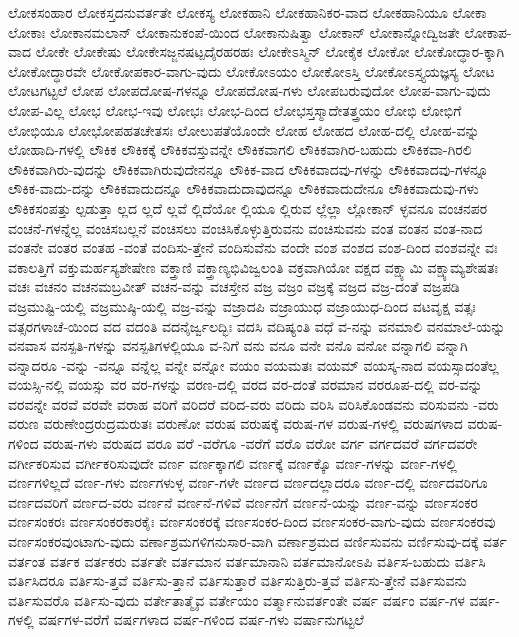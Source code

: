 {ಲೋಕಸಂಹಾರ
ಲೋಕಸ್ತದನುವರ್ತತೇ
ಲೋಕಸ್ಯ
ಲೋಕಹಾನಿ
ಲೋಕಹಾನಿಕರ-ವಾದ
ಲೋಕಹಾನಿಯೂ
ಲೋಕಾ
ಲೋಕಾಃ
ಲೋಕಾನಮಲಾನ್
ಲೋಕಾನುಕಂಪೆ-ಯಿಂದ
ಲೋಕಾನುಷಿತ್ವಾ
ಲೋಕಾನ್
ಲೋಕಾನ್ನೋದ್ವಿಜತೇ
ಲೋಕಾಪ-ವಾದ
ಲೋಕೇ
ಲೋಕೇಷು
ಲೋಕೇಸಜ್ಜನಷಟ್ಪದೈರಹರಹಃ
ಲೋಕೇಽಸ್ಮಿನ್
ಲೋಕೈಕ
ಲೋಕೋ
ಲೋಕೋದ್ಧಾರ-ಕ್ಕಾಗಿ
ಲೋಕೋದ್ಧಾರವೇ
ಲೋಕೋಪಕಾರ-ವಾಗು-ವುದು
ಲೋಕೋಽಯಂ
ಲೋಕೋಽಸ್ತಿ
ಲೋಕೋಽಸ್ತ್ಯಯಜ್ಞಸ್ಯ
ಲೋಟ
ಲೋಟಗಟ್ಟಲೆ
ಲೋಪ
ಲೋಪದೋಷ-ಗಳನ್ನೂ
ಲೋಪದೋಷ-ಗಳು
ಲೋಪಬರುವುದೋ
ಲೋಪ-ವಾಗು-ವುದು
ಲೋಪ-ವಿಲ್ಲ
ಲೋಭ
ಲೋಭ-ಇವು
ಲೋಭಃ
ಲೋಭ-ದಿಂದ
ಲೋಭಸ್ತಸ್ಮಾದೇತತ್ತ್ರಯಂ
ಲೋಭಿ
ಲೋಭಿಗೆ
ಲೋಭಿಯೂ
ಲೋಭೋಪಹತಚೇತಸಃ
ಲೋಲುಪತೆಯೊಂದೇ
ಲೋಹ
ಲೋಹದ
ಲೋಹ-ದಲ್ಲಿ
ಲೋಹ-ವನ್ನು
ಲೋಹಾದಿ-ಗಳಲ್ಲಿ
ಲೌಕಿಕ
ಲೌಕಿಕಕ್ಕೆ
ಲೌಕಿಕವಸ್ತುವನ್ನೇ
ಲೌಕಿಕವಾಗಲಿ
ಲೌಕಿಕವಾಗಿರ-ಬಹುದು
ಲೌಕಿಕವಾ-ಗಿರಲಿ
ಲೌಕಿಕವಾಗಿರು-ವುದನ್ನು
ಲೌಕಿಕವಾಗಿರುವುದೇನನ್ನೂ
ಲೌಕಿಕ-ವಾದ
ಲೌಕಿಕವಾದವು-ಗಳನ್ನು
ಲೌಕಿಕವಾದವು-ಗಳನ್ನೂ
ಲೌಕಿಕ-ವಾದು-ದನ್ನು
ಲೌಕಿಕವಾದುದನ್ನೂ
ಲೌಕಿಕವಾದುದಾವುದನ್ನೂ
ಲೌಕಿಕವಾದುದೇನೂ
ಲೌಕಿಕವಾದುವು-ಗಳು
ಲೌಕಿಕಸಂಪತ್ತು
ಲ್ಪಡುತ್ತಾ
ಲ್ಲದ
ಲ್ಲದೆ
ಲ್ಲವೆ
ಲ್ಲಿದೆಯೋ
ಲ್ಲಿಯೂ
ಲ್ಲಿರುವ
ಲ್ಲೆಲ್ಲಾ
ಲ್ಲೋಕಾನ್
ಳ್ಳವನೂ
ವಂಚನಪರ
ವಂಚನೆ-ಗಳನ್ನೆಲ್ಲ
ವಂಚಿಸಬಲ್ಲನೆ
ವಂಚಿಸಲು
ವಂಚಿಸಿಕೊಳ್ಳುತ್ತಿರುವನು
ವಂಚಿಸುವನು
ವಂತ
ವಂತನ
ವಂತ-ನಾದ
ವಂತನೇ
ವಂತರ
ವಂತಹ
-ವಂತೆ
ವಂದಿಸು-ತ್ತೇನೆ
ವಂದಿಸುವೆನು
ವಂದೇ
ವಂಶ
ವಂಶದ
ವಂಶ-ದಿಂದ
ವಂಶವನ್ನೇ
ವಃ
ವಕಾಲತ್ತಿಗೆ
ವಕ್ತುಮರ್ಹಸ್ಯಶೇಷೇಣ
ವಕ್ತ್ರಾಣಿ
ವಕ್ತ್ರಾಣ್ಯಭಿವಿಜ್ವಲಂತಿ
ವಕ್ರವಾಗಿಯೋ
ವಕ್ಷದ
ವಕ್ಷ್ಯಾಮಿ
ವಕ್ಷ್ಯಾಮ್ಯಶೇಷತಃ
ವಚಃ
ವಚನಂ
ವಚನಮಬ್ರವೀತ್
ವಚನ-ವನ್ನು
ವಚಸ್ತೇನ
ವಜ್ರ
ವಜ್ರಂ
ವಜ್ರಕ್ಕೆ
ವಜ್ರದ
ವಜ್ರ-ದಂತೆ
ವಜ್ರಪಡಿ
ವಜ್ರಮುಷ್ಟಿ-ಯಲ್ಲಿ
ವಜ್ರಮುಷ್ಠಿ-ಯಲ್ಲಿ
ವಜ್ರ-ವನ್ನು
ವಜ್ರಾದಪಿ
ವಜ್ರಾಯುಧ
ವಜ್ರಾಯುಧ-ದಿಂದ
ವಟವೃಕ್ಷ
ವತ್ಸಃ
ವತ್ಸರಗಳಾಚೆ-ಯಿಂದ
ವದ
ವದಂತಿ
ವದನೈರ್ಜ್ವಲದ್ಭಿಃ
ವದಸಿ
ವದಿಷ್ಯಂತಿ
ವಧೆ
ವ-ನನ್ನು
ವನಮಾಲಿ
ವನಮಾಲೆ-ಯನ್ನು
ವನವಾಸ
ವನಸ್ಪತಿ-ಗಳನ್ನು
ವನಸ್ಪತಿಗಳಲ್ಲಿಯೂ
ವ-ನಿಗೆ
ವನು
ವನೂ
ವನೇ
ವನೊ
ವನೋ
ವನ್ನಾಗಲಿ
ವನ್ನಾಗಿ
ವನ್ನಾದರೂ
-ವನ್ನು
-ವನ್ನೂ
ವನ್ನೆಲ್ಲ
ವನ್ನೇ
ವನ್ನೋ
ವಯಂ
ವಯಮತಃ
ವಯಮ್
ವಯಸ್ಕ-ನಾದ
ವಯಸ್ಸಾದಂತೆಲ್ಲ
ವಯಸ್ಸಿ-ನಲ್ಲಿ
ವಯಸ್ಸು
ವರ
ವರ-ಗಳನ್ನು
ವರಣ-ದಲ್ಲಿ
ವರದ
ವರ-ದಂತೆ
ವರಮಾನ
ವರರೂಪ-ದಲ್ಲಿ
ವರ-ವನ್ನು
ವರವನ್ನೇ
ವರವೆ
ವರವೇ
ವರಾಹ
ವರಿಗೆ
ವರಿದರೆ
ವರಿದ-ವರು
ವರಿದು
ವರಿಸಿ
ವರಿಸಿಕೊಂಡವನು
ವರಿಸುವನು
-ವರು
ವರುಣ
ವರುಣೇಂದ್ರರುದ್ರಮರುತಃ
ವರುಣೋ
ವರುಷ
ವರುಷಕ್ಕೆ
ವರುಷ-ಗಳ
ವರುಷ-ಗಳಲ್ಲಿ
ವರುಷಗಳಾದ
ವರುಷ-ಗಳಿಂದ
ವರುಷ-ಗಳು
ವರುಷದ
ವರೂ
ವರೆ
-ವರೆಗೂ
-ವರೆಗೆ
ವರೊ
ವರೋ
ವರ್ಗ
ವರ್ಗದವರೆ
ವರ್ಗದವರೇ
ವರ್ಗೀಕರಿಸುವ
ವರ್ಗೀಕರಿಸುವುದೇ
ವರ್ಣ
ವರ್ಣಕ್ಕಾಗಲಿ
ವರ್ಣಕ್ಕೆ
ವರ್ಣಕ್ಕೊ
ವರ್ಣ-ಗಳನ್ನು
ವರ್ಣ-ಗಳಲ್ಲಿ
ವರ್ಣಗಳಿಲ್ಲದೆ
ವರ್ಣ-ಗಳು
ವರ್ಣಗಳುಳ್ಳ
ವರ್ಣ-ಗಳೇ
ವರ್ಣದ
ವರ್ಣದಲ್ಲಾದರೂ
ವರ್ಣ-ದಲ್ಲಿ
ವರ್ಣದವರಿಗೂ
ವರ್ಣದವರಿಗೆ
ವರ್ಣದ-ವರು
ವರ್ಣನೆ
ವರ್ಣನೆ-ಗಳಿವೆ
ವರ್ಣನೆಗೆ
ವರ್ಣನೆ-ಯನ್ನು
ವರ್ಣ-ವನ್ನು
ವರ್ಣಸಂಕರ
ವರ್ಣಸಂಕರಃ
ವರ್ಣಸಂಕರಕಾರಕೈಃ
ವರ್ಣಸಂಕರಕ್ಕೆ
ವರ್ಣಸಂಕರ-ದಿಂದ
ವರ್ಣಸಂಕರ-ವಾಗು-ವುದು
ವರ್ಣಸಂಕರವು
ವರ್ಣಸಂಕರವುಂಟಾಗು-ವುದು
ವರ್ಣಾಶ್ರಮಗಳಿಗನುಸಾರ-ವಾಗಿ
ವರ್ಣಾಶ್ರಮದ
ವರ್ಣಿಸುವನು
ವರ್ಣಿಸುವು-ದಕ್ಕೆ
ವರ್ತ
ವರ್ತಂತ
ವರ್ತಕ
ವರ್ತಕರು
ವರ್ತತೇ
ವರ್ತಮಾನ
ವರ್ತಮಾನಾನಿ
ವರ್ತಮಾನೋಽಪಿ
ವರ್ತಿಸ-ಬಹುದು
ವರ್ತಿಸಿ
ವರ್ತಿಸಿದರೂ
ವರ್ತಿಸು-ತ್ತವೆ
ವರ್ತಿಸು-ತ್ತಾನೆ
ವರ್ತಿಸುತ್ತಾರೆ
ವರ್ತಿಸುತ್ತಿರು-ತ್ತವೆ
ವರ್ತಿಸು-ತ್ತೇನೆ
ವರ್ತಿಸುವನು
ವರ್ತಿಸುವರೊ
ವರ್ತಿಸು-ವುದು
ವರ್ತೇತಾತ್ಮೈವ
ವರ್ತೇಯಂ
ವರ್ತ್ಮಾನುವರ್ತಂತೇ
ವರ್ಷ
ವರ್ಷಂ
ವರ್ಷ-ಗಳ
ವರ್ಷ-ಗಳಲ್ಲಿ
ವರ್ಷಗಳ-ವರೆಗೆ
ವರ್ಷಗಳಾದ
ವರ್ಷ-ಗಳಿಂದ
ವರ್ಷ-ಗಳು
ವರ್ಷಾನುಗಟ್ಟಲೆ
}
